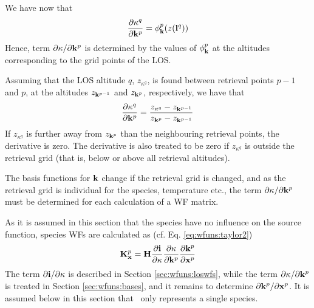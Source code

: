  We have now that
 \begin{equation}
   \frac{\partial \kappa^q}{\partial \mathbf{k}^p} = \phi^p_{\mathbf{k}}(z(\mathbf{l}^q))
  \label{eq:wfuns:kappak}
 \end{equation}
 Hence, term $\partial\kappa/ \partial \mathbf{k}^p$ is determined by the
 values of $\phi^p_{\mathbf{k}}$ at the altitudes corresponding to the grid
 points of the LOS.
 
 Assuming that the LOS altitude $q$, $z_{\kappa^q}$, is found between
 retrieval points $p-1$ and $p$, at the altitudes $z_{\mathbf{k}^{p-1}}$ and 
 $z_{\mathbf{k}^p}$, respectively, we have that
 \begin{equation}
   \frac{\partial \kappa^q}{\partial \mathbf{k}^p} =
   \frac{z_{\kappa^q}-z_{\mathbf{k}^{p-1}}}{z_{\mathbf{k}^{p}}-z_{\mathbf{k}^{p-1}}}
  \label{eq:wfuns:zz}
 \end{equation}
 If $z_{\kappa^q}$ is further away from $z_{\mathbf{k}^p}$ than the neighbouring
 retrieval points, the derivative is zero. The derivative is also treated to 
 be zero if $z_{\kappa^q}$ is outside the retrieval grid (that is, below
 or above all retrieval altitudes).

 The basis functions for $\mathbf{k}$ change if the retrieval grid is
 changed, and as the retrieval grid is individual for the species, 
 temperature etc., the term $\partial\kappa/ \partial \mathbf{k}^p$ 
 must be determined for each calculation of a WF matrix.


 \label{sec:wfuns:species}
 
 As it is assumed in this section that the species have no influence on
 the source function, species WFs are calculated as (cf. Eq.
 \ref{eq:wfuns:taylor2})
 \begin{equation}
    \mathbf{K}_{\mathbf{x}}^p = \mathbf{H}
                 \frac{\partial\mathbf{i}}{\partial \kappa}
                 \frac{\partial \kappa}{\partial \mathbf{k}^p}
                 \frac{\partial \mathbf{k}^p}{\partial \mathbf{x}^p}
  \label{eq:wfuns:species}
 \end{equation}
 The term $\partial\mathbf{i} / \partial \kappa$ is described in Section
 \ref{sec:wfuns:loswfs}, while the term $\partial \kappa /\partial
 \mathbf{k}^p$ is treated in Section \ref{sec:wfuns:bases}, and it
 remains to determine $\partial \mathbf{k}^p / \partial \mathbf{x}^p$. It is
 assumed below in this section that \xt\ only represents a single 
 species.

